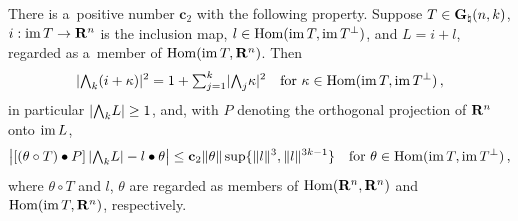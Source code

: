 \begin{lemma}
    \label{al:8.14}
    There is a~positive number $\mathbf{c}_2$ with the following property. Suppose $T \in
    \mathbf{G}_{\natural}(n,k)$, $i : \operatorname{im} T \to \mathbf{R}^{n}$ is the inclusion map, $l \in \operatorname{Hom}(\operatorname{im} T, \operatorname{im}
    T^\perp)$, and $L = i + l$, regarded as a~member of $\operatorname{Hom}(\operatorname{im} T, \mathbf{R}^{n})$. Then
    \begin{equation}
        \label{eq:8.14:1}
        |{\textstyle\boldsymbol{\bigwedge}}_{{k}} (i + \kappa)|^2 = 1 + {\textstyle\sum_{j=1}^{k}} |{\textstyle\boldsymbol{\bigwedge}}_{{j}} \kappa|^2 \quad
        \text{for $\kappa \in \operatorname{Hom}(\operatorname{im} T, \operatorname{im} T^\perp)$} \,,
    \end{equation}
    in particular $|{\textstyle\boldsymbol{\bigwedge}}_{{k}} L| \ge 1$, and, with $P$ denoting the orthogonal projection of
    $\mathbf{R}^{n}$ onto $\operatorname{im} L$,
    \begin{displaymath}
        \big| [(\theta \circ T) \bullet P] \, |{\textstyle\boldsymbol{\bigwedge}}_{{k}} L| - l \bullet \theta \big| \le
        \mathbf{c}_2 \|\theta\| \sup \{ \|l\|^3, \|l\|^{3 k - 1} \} \quad \text{for $\theta \in
        \operatorname{Hom}(\operatorname{im} T, \operatorname{im} T^\perp)$} \,,
    \end{displaymath}
    where $\theta \circ T$ and $l$, $\theta$ are regarded as members of $\operatorname{Hom}(\mathbf{R}^{n},
    \mathbf{R}^{n})$ and $\operatorname{Hom}(\operatorname{im} T, \mathbf{R}^{n})$, respectively.
\end{lemma}

